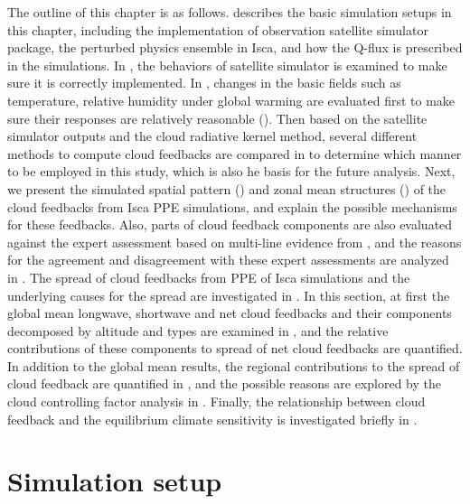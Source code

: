 The outline of this chapter is as follows.  describes the basic simulation setups in this chapter, including the implementation of observation satellite simulator package, the perturbed physics ensemble in Isca, and how the Q-flux is prescribed in the simulations. In , the behaviors of satellite simulator is examined to make sure it is correctly implemented. In , changes in the basic fields such as temperature, relative humidity under global warming are evaluated first to make sure their responses are relatively reasonable (). Then based on the satellite simulator outputs and the cloud radiative kernel method, several different methods to compute cloud feedbacks are compared in  to determine which manner to be employed in this study, which is also he basis for the future analysis. Next, we present the simulated spatial pattern () and zonal mean structures () of the cloud feedbacks from Isca PPE simulations, and explain the possible mechanisms for these feedbacks. Also, parts of cloud feedback components are also evaluated against the expert assessment based on multi-line evidence from \cite{Sherwood2020}, and the reasons for the agreement and disagreement with these expert assessments are analyzed in . The spread of cloud feedbacks from PPE of Isca simulations and the underlying causes for the spread are investigated in . In this section, at first the global mean longwave, shortwave and net cloud feedbacks and their components decomposed by altitude and types are examined in , and the relative contributions of these components to spread of net cloud feedbacks are quantified. In addition to the global mean results, the regional contributions to the spread of cloud feedback are quantified in , and the possible reasons are explored by the cloud controlling factor analysis in . Finally, the relationship between cloud feedback and the equilibrium climate sensitivity is investigated briefly in .

\section{Simulation setup}
\label{sec:simulation_setup_cld_fbk}

